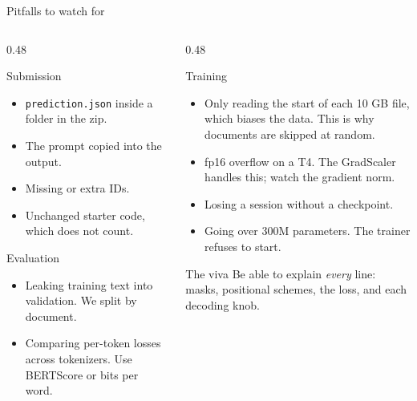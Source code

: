 \documentclass[aspectratio=169,11pt]{beamer}
\newcommand{\code}[1]{\texttt{\small #1}}
\begin{document}
\begin{frame}{Pitfalls to watch for}
  \begin{columns}[T]
    \begin{column}{0.48\textwidth}
      \begin{alertblock}{Submission}
        \small
        \begin{itemize}
          \item \code{prediction.json} inside a folder in the zip.
          \item The prompt copied into the output.
          \item Missing or extra IDs.
          \item Unchanged starter code, which does not count.
        \end{itemize}
      \end{alertblock}
      \begin{alertblock}{Evaluation}
        \small
        \begin{itemize}
          \item Leaking training text into validation. We split by document.
          \item Comparing per-token losses across tokenizers. Use BERTScore or bits per word.
        \end{itemize}
      \end{alertblock}
    \end{column}
    \begin{column}{0.48\textwidth}
      \begin{alertblock}{Training}
        \small
        \begin{itemize}
          \item Only reading the start of each 10 GB file, which biases the data. This is why documents are skipped at random.
          \item fp16 overflow on a T4. The GradScaler handles this; watch the gradient norm.
          \item Losing a session without a checkpoint.
          \item Going over 300M parameters. The trainer refuses to start.
        \end{itemize}
      \end{alertblock}
      \begin{block}{The viva}
        \small
        Be able to explain \emph{every} line: masks, positional schemes, the loss, and each decoding knob.
      \end{block}
    \end{column}
  \end{columns}
\end{frame}
\end{document}
